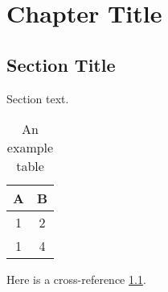
\chapter{Chapter Title}

    \section{Section Title}
    
        Section text.
        
            \begin{table}[h]
                \centering
                \begin{tabular}{c|c}
                    A & B \\
                    \hline
                    1 & 2 \\
                    1 & 4 \\
                \end{tabular}
                \caption{An example table}
                \label{tab:example-table}
            \end{table}
            
        Here is a cross-reference \ref{tab:example-table}.
